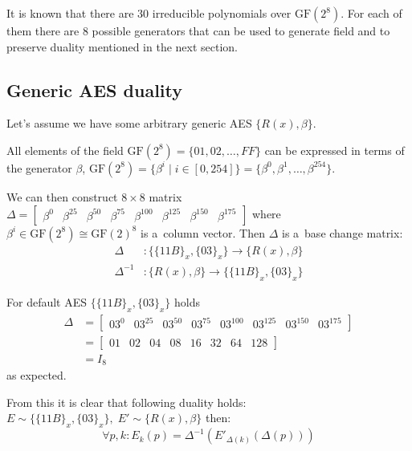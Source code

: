 \documentclass[11pt,oneside,final]{fithesis2}
\newcommand{\gfe}{\ensuremath{\text{GF}\left(2^8\right)}}
\begin{document}
	It is known that there are $30$ irreducible polynomials over $\gfe$. For each of them there are $8$ possible
	generators that can be used to generate field and to preserve duality mentioned in the next section.

	\subsection{Generic AES duality}
	Let's assume we have some arbitrary generic AES $\{R(x), \beta \}$. 

	All elements of the field $\gfe = \{01, 02, \dots, FF\}$
	can be expressed in terms of the generator $\beta$, $\gfe = \{\beta^i \; | \; i \in [0,254]\} = \{\beta^0, \beta^1, \dots, \beta^{254}\}$.

	We can then construct $8 \times 8$ matrix $\Delta = \begin{bmatrix} \beta^0 & \beta^{25} & \beta^{50} & \beta^{75} & \beta^{100} & \beta^{125} & \beta^{150} & \beta^{175}  \end{bmatrix}$ where 
	$\beta^i \in \gfe \cong \text{GF}(2)^8$ is a~column vector. Then $\Delta$ is a~base change matrix:
	\begin{subequations}
	\begin{align}
	    \Delta &: \{\{11B\}_x, \{03\}_x\}  \longrightarrow \{R(x), \beta \} \\
	    \Delta^{-1} &: \{R(x), \beta \}  \longrightarrow \{\{11B\}_x, \{03\}_x\}
	\end{align}
	\end{subequations}

	For default AES $\{\{11B\}_x, \{03\}_x\}$ holds
	\begin{align*}
	    \Delta &= \begin{bmatrix} 03^0 & 03^{25} & 03^{50} & 03^{75} & 03^{100} & 03^{125} & 03^{150} & 03^{175}  \end{bmatrix} \\
	           &= \begin{bmatrix} 01 & 02 & 04 & 08 & 16 & 32 & 64 & 128 \end{bmatrix} \\
		   &= I_8
	\end{align*}
	as expected.

	From this it is clear that following duality holds: $E \sim \{\{11B\}_x, \{03\}_x\}, \; E' \sim \{R(x), \beta \}$ then:
	\begin{equation} 
	\forall p, k: E_k(p) = \Delta^{-1}\left(E'_{\Delta(k)}(\Delta(p))\right)
	\end{equation}
\end{document}
